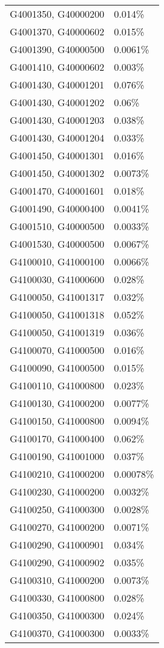 \begin{longtable}[]{@{}ll@{}}
G4001350, G40000200 & 0.014\% \\
G4001370, G40000602 & 0.015\% \\
G4001390, G40000500 & 0.0061\% \\
G4001410, G40000602 & 0.003\% \\
G4001430, G40001201 & 0.076\% \\
G4001430, G40001202 & 0.06\% \\
G4001430, G40001203 & 0.038\% \\
G4001430, G40001204 & 0.033\% \\
G4001450, G40001301 & 0.016\% \\
G4001450, G40001302 & 0.0073\% \\
G4001470, G40001601 & 0.018\% \\
G4001490, G40000400 & 0.0041\% \\
G4001510, G40000500 & 0.0033\% \\
G4001530, G40000500 & 0.0067\% \\
G4100010, G41000100 & 0.0066\% \\
G4100030, G41000600 & 0.028\% \\
G4100050, G41001317 & 0.032\% \\
G4100050, G41001318 & 0.052\% \\
G4100050, G41001319 & 0.036\% \\
G4100070, G41000500 & 0.016\% \\
G4100090, G41000500 & 0.015\% \\
G4100110, G41000800 & 0.023\% \\
G4100130, G41000200 & 0.0077\% \\
G4100150, G41000800 & 0.0094\% \\
G4100170, G41000400 & 0.062\% \\
G4100190, G41001000 & 0.037\% \\
G4100210, G41000200 & 0.00078\% \\
G4100230, G41000200 & 0.0032\% \\
G4100250, G41000300 & 0.0028\% \\
G4100270, G41000200 & 0.0071\% \\
G4100290, G41000901 & 0.034\% \\
G4100290, G41000902 & 0.035\% \\
G4100310, G41000200 & 0.0073\% \\
G4100330, G41000800 & 0.028\% \\
G4100350, G41000300 & 0.024\% \\
G4100370, G41000300 & 0.0033\% \\

\end{longtable}
